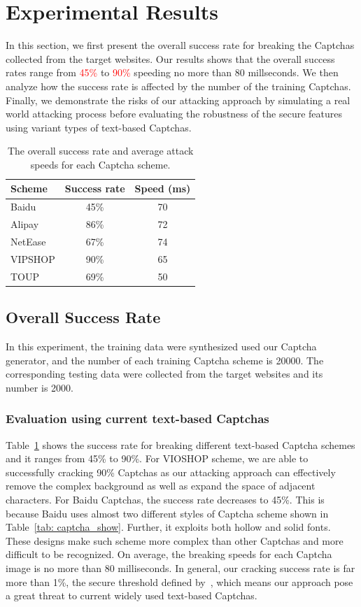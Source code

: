 \section{Experimental Results}
In this section, we first present the overall success rate for breaking the Captchas collected from the target websites. Our results shows that the overall success rates range from \textcolor{red}{45\%} to \textcolor{red}{90\%} speeding no more than 80 millseconds.
We then analyze how the success rate is affected by the number of the training Captchas.
Finally, we demonstrate the risks of our attacking approach by simulating a real world attacking process before evaluating the robustness of the secure features using variant types of text-based Captchas.

\begin{table}[t]
    \centering
    \caption{The overall success rate and average attack speeds for each Captcha scheme.}
    \label{table: overall_rate}
    \begin{tabular}{lcc}
        \toprule
        Scheme & Success rate  & Speed (ms)\\
        \midrule
        Baidu & 45\% & 70 \\
        Alipay & 86\% & 72 \\
        NetEase & 67\% & 74 \\
        VIPSHOP & 90\% & 65 \\
        TOUP & 69\% & 50 \\
        \bottomrule
    \end{tabular}
\end{table}

\subsection{Overall Success Rate}
In this experiment, the training data were synthesized used our Captcha generator, and the number of each training Captcha scheme is 20000. The corresponding testing data were collected from the target websites and its number is 2000.
\subsubsection{Evaluation using current text-based Captchas}
Table~\ref{table: overall_rate} shows the success rate for breaking different text-based Captcha schemes and it ranges from 45\% to 90\%. For VIOSHOP scheme, we are able to successfully cracking 90\% Captchas as our attacking approach can effectively remove the complex background as well as expand the space of adjacent characters. For Baidu Captchas, the success rate decreases to 45\%. This is because Baidu uses almost two different styles of Captcha scheme shown in Table~\ref{tab: captcha_show}. Further, it exploits both hollow and solid fonts. These designs make such scheme more complex than other Captchas and more difficult to be recognized.
On average, the breaking speeds for each Captcha image is no more than 80 milliseconds.
In general, our cracking success rate is far more than 1\%, the secure threshold defined by~\cite{Bursztein2011Text}, which means our approach pose a great threat to current widely used text-based Captchas.

